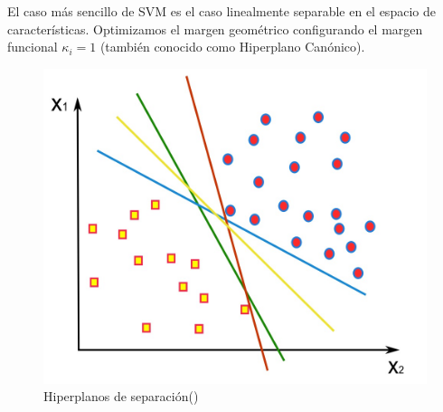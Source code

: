 El caso más sencillo de SVM es el caso linealmente separable en el espacio de características. Optimizamos el margen geométrico configurando el margen funcional $\kappa_i = 1$ (también conocido como Hiperplano Canónico).


 \begin{figure}[H]
	\begin{center}
		\includegraphics[width=1\textwidth]{2/figures/svm1.jpeg}
		\caption{Hiperplanos de separación(\cite{tecnica3})}
	\end{center}
\end{figure}

